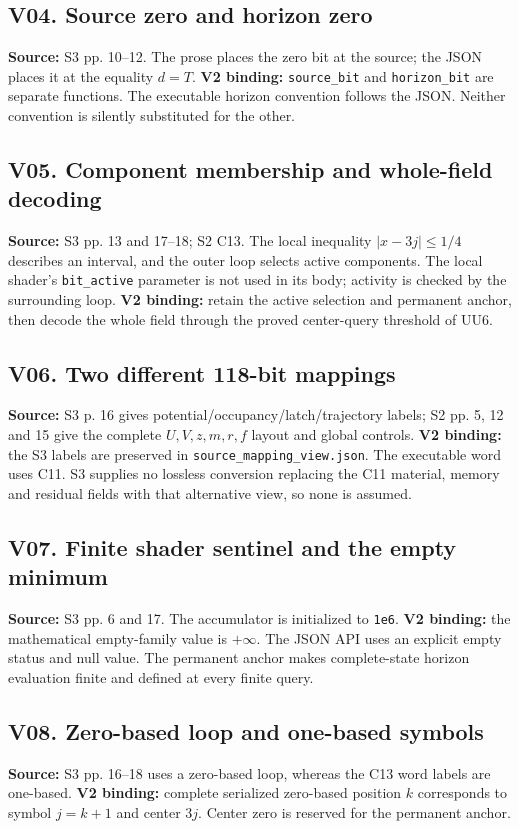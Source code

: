 \documentclass[11pt,a4paper]{article}
\numberwithin{equation}{section}
\begin{document}
\subsection*{V04. Source zero and horizon zero}
\textbf{Source:} S3 pp. 10--12. The prose places the zero bit at the source; the JSON places it at the equality $d=T$. \textbf{V2 binding:} \texttt{source\_bit} and \texttt{horizon\_bit} are separate functions. The executable horizon convention follows the JSON. Neither convention is silently substituted for the other.

\subsection*{V05. Component membership and whole-field decoding}
\textbf{Source:} S3 pp. 13 and 17--18; S2 C13. The local inequality $|x-3j|\le1/4$ describes an interval, and the outer loop selects active components. The local shader's \texttt{bit\_active} parameter is not used in its body; activity is checked by the surrounding loop. \textbf{V2 binding:} retain the active selection and permanent anchor, then decode the whole field through the proved center-query threshold of UU6.

\subsection*{V06. Two different 118-bit mappings}
\textbf{Source:} S3 p. 16 gives potential/occupancy/latch/trajectory labels; S2 pp. 5, 12 and 15 give the complete $U,V,z,m,r,f$ layout and global controls. \textbf{V2 binding:} the S3 labels are preserved in \texttt{source\_mapping\_view.json}. The executable word uses C11. S3 supplies no lossless conversion replacing the C11 material, memory and residual fields with that alternative view, so none is assumed.

\subsection*{V07. Finite shader sentinel and the empty minimum}
\textbf{Source:} S3 pp. 6 and 17. The accumulator is initialized to \texttt{1e6}. \textbf{V2 binding:} the mathematical empty-family value is $+\infty$. The JSON API uses an explicit empty status and null value. The permanent anchor makes complete-state horizon evaluation finite and defined at every finite query.

\subsection*{V08. Zero-based loop and one-based symbols}
\textbf{Source:} S3 pp. 16--18 uses a zero-based loop, whereas the C13 word labels are one-based. \textbf{V2 binding:} complete serialized zero-based position $k$ corresponds to symbol $j=k+1$ and center $3j$. Center zero is reserved for the permanent anchor.
\end{document}
